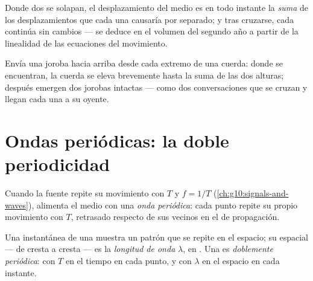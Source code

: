 \begin{proposition}\label{prop:g12:mechanical-waves:superposition}
Donde dos  se solapan, el desplazamiento del medio es en todo
instante la \emph{suma} de los desplazamientos que cada una causaría por
separado; y tras cruzarse, cada  continúa sin cambios --- se deduce
en el volumen del segundo año a partir de la linealidad de las
ecuaciones del movimiento. \admitted
\end{proposition}

\begin{example}\label{ex:g12:mechanical-waves:crossing}
Envía una joroba hacia arriba desde cada extremo de una cuerda: donde se
encuentran, la cuerda se eleva brevemente hasta la suma de las dos
alturas; después emergen dos jorobas intactas --- como dos
conversaciones que se cruzan y llegan cada una a su oyente.
\end{example}

\section{Ondas periódicas: la doble periodicidad}

\begin{definition}\label{def:g12:mechanical-waves:periodic}
Cuando la fuente repite su movimiento con  $T$ y 
$f = 1/T$ (\cref{ch:g10:signals-and-waves}), alimenta el medio con una
\emph{onda periódica}: cada punto repite su propio
movimiento con  $T$, retrasado respecto de sus vecinos en el
 de propagación.
\end{definition}

\begin{definition}\label{def:g12:mechanical-waves:wavelength}
Una instantánea de una  muestra un patrón que se repite en
el espacio; su  espacial --- de cresta a cresta --- es la
\emph{longitud de onda} $\lambda$, en .
Una  es \emph{doblemente periódica}: con  $T$ en el tiempo en cada punto, y con 
$\lambda$ en el espacio en cada instante.
\end{definition}

